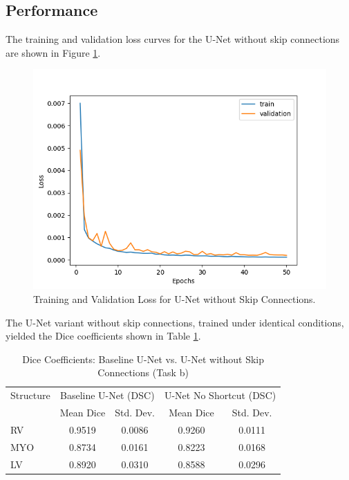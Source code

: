 \documentclass{article}
\begin{document}
\subsection{Performance}
The training and validation loss curves for the U-Net without skip connections are shown in Figure \ref{fig:no_shortcut_loss}.
\begin{figure}[H]
  \centering
  \includegraphics[width=0.8\linewidth]{../result/no_shortcut_unet.png}
  \caption{Training and Validation Loss for U-Net without Skip Connections.}
  \label{fig:no_shortcut_loss}
\end{figure}

The U-Net variant without skip connections, trained under identical conditions, yielded the Dice coefficients shown in Table \ref{tab:no_shortcut_unet_comparison}.
\begin{table}[H]
  \centering
  \caption{Dice Coefficients: Baseline U-Net vs. U-Net without Skip Connections (Task b)}
  \label{tab:no_shortcut_unet_comparison}
  \begin{tabular}{l|cc|cc}
    \toprule
    Structure & \multicolumn{2}{c|}{Baseline U-Net (DSC)} & \multicolumn{2}{c}{U-Net No Shortcut (DSC)}                         \\
              & Mean Dice                                 & Std. Dev.                                   & Mean Dice & Std. Dev. \\
    \midrule
    RV        & 0.9519                                    & 0.0086                                      & 0.9260    & 0.0111    \\
    MYO       & 0.8734                                    & 0.0161                                      & 0.8223    & 0.0168    \\
    LV        & 0.8920                                    & 0.0310                                      & 0.8588    & 0.0296    \\
    \bottomrule
  \end{tabular}
\end{table}
\end{document}
